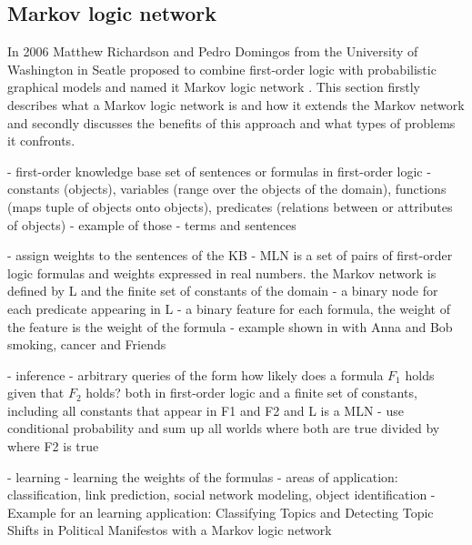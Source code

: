 



\subsection{Markov logic network} \label{sec:mln}

In 2006 Matthew Richardson and Pedro Domingos from the University of Washington in Seatle proposed to combine first-order logic with probabilistic graphical models and named it Markov logic network \cite{richardson2006markov}. This section firstly describes what a Markov logic network is and how it extends the Markov network and secondly discusses the benefits of this approach and what types of problems it confronts.

- first-order knowledge base set of sentences or formulas in first-order logic
- constants (objects), variables (range over the objects of the domain), functions (maps tuple of objects onto objects), predicates (relations between or attributes of objects)
- example of those
- terms and sentences

- assign weights to the sentences of the KB
- MLN is a set of pairs of first-order logic formulas and weights expressed in real numbers. the Markov network is defined by L and the finite set of constants of the domain 
 - a binary node for each predicate appearing in L
 - a binary feature for each formula, the weight of the feature is the weight of the formula %
- example shown in \cite{richardson2006markov} with Anna and Bob smoking, cancer and Friends

- inference
 - arbitrary queries of the form how likely does a formula $F_1$ holds given that $F_2$ holds? both in first-order logic and a finite set of constants, including all constants that appear in F1 and F2 \cite{richardson2006markov} and L is a MLN
  - use conditional probability and sum up all worlds where both are true divided by where F2 is true
  
- learning
 - learning the weights of the formulas
 - areas of application: classification, link prediction, social network modeling, object identification
 - Example for an learning application: Classifying Topics and Detecting Topic Shifts in Political Manifestos with a Markov logic network \cite{zirn2016classifying}


